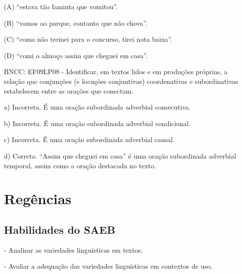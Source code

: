 \begin{itemize}
\begin{itemize}
(A) ``estava tão faminta que vomitou''.

(B) ``vamos ao parque, contanto que não chova''.

(C) ``como não treinei para o concurso, tirei nota baixa''.

(D) ``comi o almoço assim que cheguei em casa''.

BNCC: EF09LP08 - Identificar, em textos lidos e em produções próprias, a
relação que conjunções (e locuções conjuntivas) coordenativas e
subordinativas estabelecem entre as orações que conectam.

a) Incorreta. É uma oração subordinada adverbial consecutiva.

b) Incorreta. É uma oração subordinada adverbial condicional.

c) Incorreta. É uma oração subordinada adverbial causal.

d) Correta. ``Assim que cheguei em casa'' é uma oração subordinada
adverbial temporal, assim como a oração destacada no texto.

\chapter{Regências}

\section{Habilidades do SAEB}

- Analisar as variedades linguísticas em textos.

- Avaliar a adequação das variedades linguísticas em contextos de uso.

\end{itemize}
\end{itemize}
